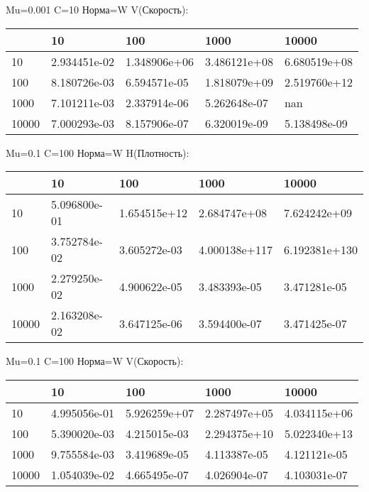 \documentclass[a4paper, 12pt]{article}
\begin{document}
\bigskip
\bigskip
\bigskip


Mu=0.001  C=10 Норма=W V(Скорость):


\begin{tabular}{lllll}
\toprule
{} &         10    &         100   &         1000  &         10000 \\
\midrule
10    &  2.934451e-02 &  1.348906e+06 &  3.486121e+08 &  6.680519e+08 \\
100   &  8.180726e-03 &  6.594571e-05 &  1.818079e+09 &  2.519760e+12 \\
1000  &  7.101211e-03 &  2.337914e-06 &  5.262648e-07 &           nan \\
10000 &  7.000293e-03 &  8.157906e-07 &  6.320019e-09 &  5.138498e-09 \\
\bottomrule
\end{tabular}



\bigskip
\bigskip
\bigskip


Mu=0.1  C=100 Норма=W H(Плотность):


\begin{tabular}{lllll}
\toprule
{} &         10    &         100   &          1000  &          10000 \\
\midrule
10    &  5.096800e-01 &  1.654515e+12 &   2.684747e+08 &   7.624242e+09 \\
100   &  3.752784e-02 &  3.605272e-03 &  4.000138e+117 &  6.192381e+130 \\
1000  &  2.279250e-02 &  4.900622e-05 &   3.483393e-05 &   3.471281e-05 \\
10000 &  2.163208e-02 &  3.647125e-06 &   3.594400e-07 &   3.471425e-07 \\
\bottomrule
\end{tabular}



\bigskip
\bigskip
\bigskip


Mu=0.1  C=100 Норма=W V(Скорость):


\begin{tabular}{lllll}
\toprule
{} &         10    &         100   &         1000  &         10000 \\
\midrule
10    &  4.995056e-01 &  5.926259e+07 &  2.287497e+05 &  4.034115e+06 \\
100   &  5.390020e-03 &  4.215015e-03 &  2.294375e+10 &  5.022340e+13 \\
1000  &  9.755584e-03 &  3.419689e-05 &  4.113387e-05 &  4.121121e-05 \\
10000 &  1.054039e-02 &  4.665495e-07 &  4.026904e-07 &  4.103031e-07 \\
\bottomrule
\end{tabular}
\end{document}
